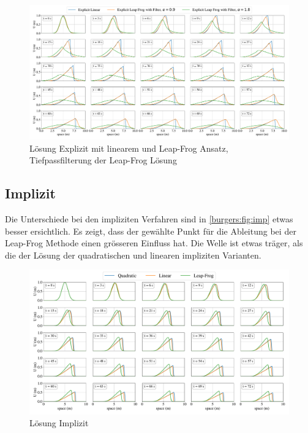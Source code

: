 	  \begin{figure}
		\centering
		\includegraphics[width=1\textwidth]{papers/burgers/BurgersEquation/time_filter.pdf}
		\caption{L\"osung Explizit mit linearem und Leap-Frog Ansatz, Tiefpassfilterung der Leap-Frog L\"osung }
		\label{burgers:fig:time}
		\end{figure}


	\subsection{Implizit}

	Die Unterschiede bei den impliziten Verfahren sind in \autoref{burgers:fig:imp} etwas besser ersichtlich.
	Es zeigt, dass der gew\"ahlte Punkt f\"ur die Ableitung bei der Leap-Frog Methode einen gr\"osseren Einfluss hat.
	Die Welle ist etwas tr\"ager, als die der L\"osung der quadratischen und linearen impliziten Varianten.

    \begin{figure}
	\centering
	\includegraphics[width=1\textwidth]{papers/burgers/BurgersEquation/imp_paper.pdf}
	\caption{L\"osung Implizit}
	\label{burgers:fig:imp}
	\end{figure}
